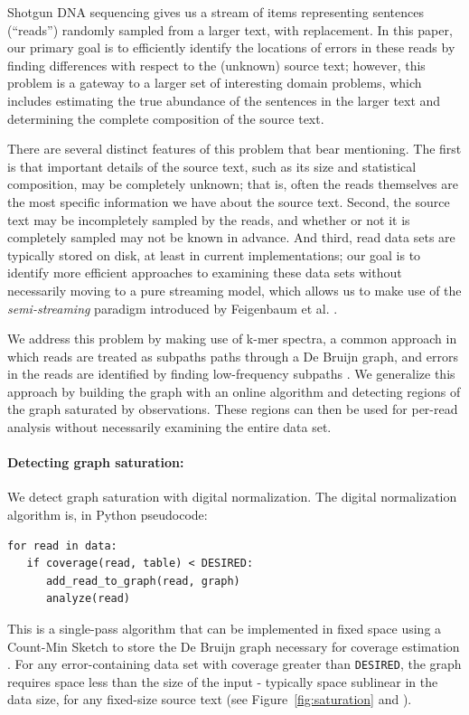 \documentclass{article}
\begin{document}

\label{sec:alg}

Shotgun DNA sequencing gives us a stream
of items representing sentences (``reads'') randomly sampled from a
larger text, with replacement.  In this paper, our primary goal is to
efficiently identify the locations of errors in these reads by
finding differences with respect to the (unknown) source text; however, this
problem is a gateway to a larger set of interesting domain problems,
which includes estimating the true abundance of the sentences in the
larger text and determining the complete composition of the source text.

There are several distinct features of this problem that bear
mentioning.  The first is that important details of the source text,
such as its size and statistical composition, may be completely
unknown; that is, often the reads themselves are the most specific
information we have about the source text.  Second, the source text
may be incompletely sampled by the reads, and whether or not it is
completely sampled may not be known in advance.  And third, read
data sets are typically stored on disk, at least in current
implementations; our goal is to identify more efficient approaches to
examining these data sets without necessarily moving to a pure
streaming model, which allows us to make use of the {\em
  semi-streaming} paradigm introduced by Feigenbaum et
al. \cite{Feigenbaum2005}.

We address this problem by making use of k-mer spectra, a common
approach in which reads are treated as subpaths paths through a De
Bruijn graph, and errors in the reads are identified by finding
low-frequency subpaths \cite{Pevzner}.  We generalize this approach by
building the graph with an online algorithm and detecting regions of
the graph saturated by observations.  These regions can then be used
for per-read analysis without necessarily examining the entire data
set.

\paragraph{Detecting graph saturation:}
We detect graph saturation with digital normalization. The digital
normalization algorithm is, in Python pseudocode:
\begin{verbatim}
for read in data:
   if coverage(read, table) < DESIRED:
      add_read_to_graph(read, graph)
      analyze(read)
\end{verbatim}
This is a single-pass algorithm that can be implemented in fixed space
using a Count-Min Sketch to store the De Bruijn graph necessary for
coverage estimation \cite{Pell2012, Zhang2014}.  For any
error-containing data set with coverage greater than {\tt DESIRED},
the graph requires space less than the size of the input - typically
space sublinear in the data size, for any fixed-size source text (see
Figure~\ref{fig:saturation} and \cite{Zhang2014}).
\end{document}

